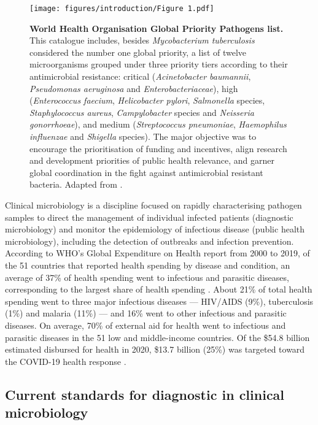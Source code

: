 \begin{figure}[h!]
\centering
\texttt{[image: figures/introduction/Figure 1.pdf]}
\caption{\textbf{World Health Organisation Global Priority Pathogens list.} This catalogue includes, besides \textit{Mycobacterium tuberculosis} considered the number one global priority, a list of twelve microorganisms grouped under three priority tiers according to their antimicrobial resistance: critical (\textit{Acinetobacter baumannii}, \textit{Pseudomonas aeruginosa} and \textit{Enterobacteriaceae}), high (\textit{Enterococcus faecium}, \textit{Helicobacter pylori}, \textit{Salmonella} species, \textit{Staphylococcus aureus}, \textit{Campylobacter} species and \textit{Neisseria gonorrhoeae}), and medium (\textit{Streptococcus pneumoniae}, \textit{Haemophilus influenzae} and \textit{Shigella} species). The major objective was to encourage the prioritisation of funding and incentives, align research and development priorities of public health relevance, and garner global coordination in the fight against antimicrobial resistant bacteria. Adapted from \cite{world_health_organization_prioritization_2017}.}
\label{fig:figure1}
\end{figure}

Clinical microbiology is a discipline focused on rapidly characterising pathogen samples to direct the management of individual infected patients (diagnostic microbiology) and monitor the epidemiology of infectious disease (public health microbiology), including the detection of outbreaks and infection prevention. 
According to WHO's Global Expenditure on Health report from 2000 to 2019, of the 51 countries that reported health spending by disease and condition, an average of 37\% of health spending went to infectious and parasitic diseases, corresponding to the largest share of health spending \citep{world_health_organization_global_2021}. 
About 21\% of total health spending went to three major infectious diseases — HIV/AIDS (9\%), tuberculosis (1\%) and malaria (11\%) — and 16\% went to other infectious and parasitic diseases. 
On average, 70\% of external aid for health went to infectious and parasitic diseases in the 51 low and middle-income countries. 
Of the \$54.8 billion estimated disbursed for health in 2020, \$13.7 billion (25\%) was targeted toward the COVID-19 health response \citep{micah_tracking_2021}.

\subsection{Current standards for diagnostic in clinical microbiology} \label{ssec:current_standards}


